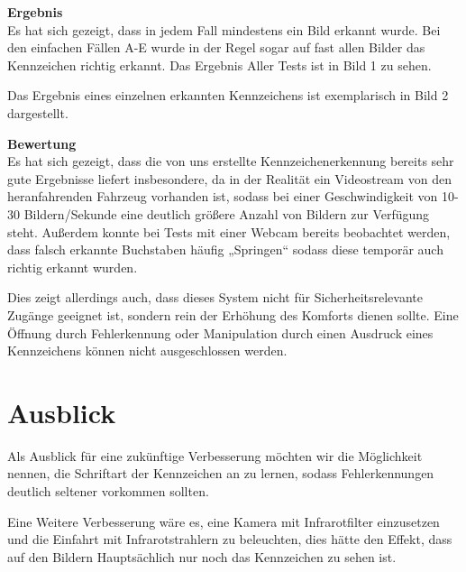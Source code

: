 \documentclass{../Vorlage/sebDenCls}
\begin{document}
\textbf{Ergebnis} \\
Es hat sich gezeigt, dass in jedem Fall mindestens ein Bild erkannt wurde. Bei den einfachen Fällen A-E wurde in der Regel sogar auf fast allen Bilder das Kennzeichen richtig erkannt. Das Ergebnis Aller Tests ist in Bild 1 zu sehen.

Das Ergebnis eines einzelnen erkannten Kennzeichens ist exemplarisch in Bild 2 dargestellt.


\textbf{Bewertung} \\
Es hat sich gezeigt, dass die von uns erstellte Kennzeichenerkennung bereits sehr gute Ergebnisse liefert insbesondere, da in der Realität ein Videostream von den heranfahrenden Fahrzeug vorhanden ist, sodass bei einer Geschwindigkeit von 10-30 Bildern/Sekunde eine deutlich größere Anzahl von Bildern zur Verfügung steht. Außerdem konnte bei Tests mit einer Webcam bereits beobachtet werden, dass falsch erkannte Buchstaben häufig „Springen“ sodass diese temporär auch richtig erkannt wurden. 

Dies zeigt allerdings auch, dass dieses System nicht für Sicherheitsrelevante Zugänge geeignet ist, sondern rein der Erhöhung des Komforts dienen sollte. Eine Öffnung durch Fehlerkennung oder Manipulation durch einen Ausdruck eines Kennzeichens können nicht ausgeschlossen werden.
\section{Ausblick}
Als Ausblick für eine zukünftige Verbesserung möchten wir die Möglichkeit nennen, die Schriftart der Kennzeichen an zu lernen, sodass Fehlerkennungen deutlich seltener vorkommen sollten.

Eine Weitere Verbesserung wäre es, eine Kamera mit Infrarotfilter einzusetzen und die Einfahrt mit Infrarotstrahlern zu beleuchten, dies hätte den Effekt, dass auf den Bildern Hauptsächlich nur noch das Kennzeichen zu sehen ist. 
\end{document}
